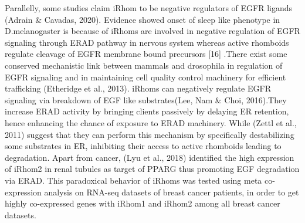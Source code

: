 \documentclass[fleqn,10pt,lineno]{wlpeerj}
\begin{document}
Parallelly, some studies claim iRhom to be negative regulators of EGFR ligands (Adrain & Cavadas, 2020). Evidence showed onset of sleep like phenotype in D.melanogaster is because of iRhoms are involved in negative regulation of EGFR signaling through ERAD pathway in nervous system whereas active rhomboids regulate cleavage of EGFR membrane bound precursors [16] .There exist some conserved mechanistic link between mammals and drosophila in regulation of EGFR signaling and in maintaining cell quality control machinery for efficient trafficking (Etheridge et al., 2013). iRhoms can negatively regulate EGFR signaling via breakdown of EGF like substrates(Lee, Nam & Choi, 2016).They increase ERAD activity by bringing clients passively by delaying ER retention, hence enhancing the chance of exposure to ERAD machinery. While (Zettl et al., 2011) suggest that they can perform this mechanism by specifically destabilizing some substrates in ER, inhibiting their access to active rhomboids leading to degradation. Apart from cancer, (Lyu et al., 2018) identified the high expression of iRhom2 in renal tubules as target of PPARG thus promoting EGF degradation via ERAD.
This paradoxical behavior of iRhoms was tested using meta co-expression analysis on RNA-seq datasets of breast cancer patients, in order to get highly co-expressed genes with iRhom1 and iRhom2 among all breast cancer datasets.
\end{document}
